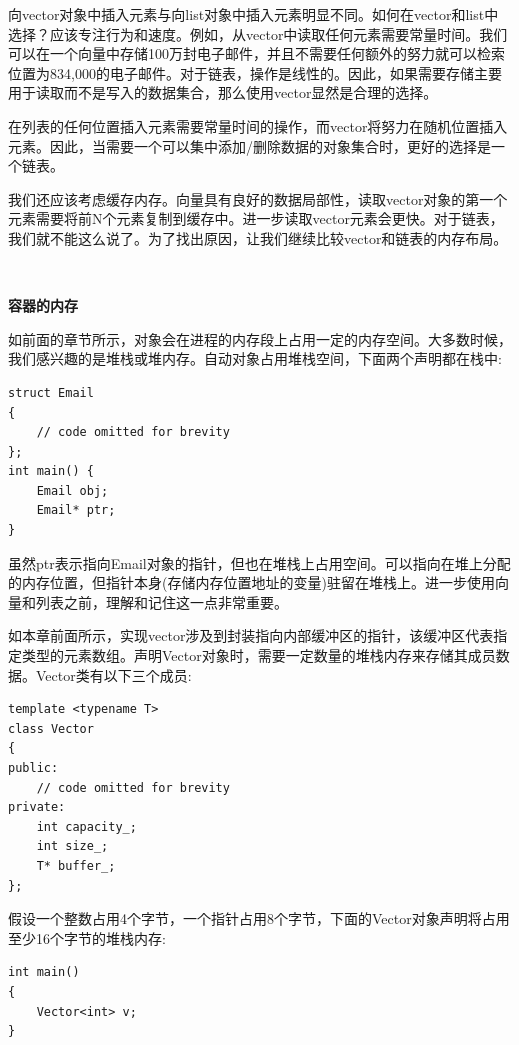 向vector对象中插入元素与向list对象中插入元素明显不同。如何在vector和list中选择？应该专注行为和速度。例如，从vector中读取任何元素需要常量时间。我们可以在一个向量中存储100万封电子邮件，并且不需要任何额外的努力就可以检索位置为834,000的电子邮件。对于链表，操作是线性的。因此，如果需要存储主要用于读取而不是写入的数据集合，那么使用vector显然是合理的选择。 \par
在列表的任何位置插入元素需要常量时间的操作，而vector将努力在随机位置插入元素。因此，当需要一个可以集中添加/删除数据的对象集合时，更好的选择是一个链表。 \par
我们还应该考虑缓存内存。向量具有良好的数据局部性，读取vector对象的第一个元素需要将前N个元素复制到缓存中。进一步读取vector元素会更快。对于链表，我们就不能这么说了。为了找出原因，让我们继续比较vector和链表的内存布局。 \par

\noindent\textbf{}\ \par
\textbf{容器的内存} \ \par
如前面的章节所示，对象会在进程的内存段上占用一定的内存空间。大多数时候，我们感兴趣的是堆栈或堆内存。自动对象占用堆栈空间，下面两个声明都在栈中: \par

\begin{lstlisting}[caption={}]
struct Email
{
	// code omitted for brevity
};
int main() {
	Email obj;
	Email* ptr;
}
\end{lstlisting}

虽然ptr表示指向Email对象的指针，但也在堆栈上占用空间。可以指向在堆上分配的内存位置，但指针本身(存储内存位置地址的变量)驻留在堆栈上。进一步使用向量和列表之前，理解和记住这一点非常重要。 \par
如本章前面所示，实现vector涉及到封装指向内部缓冲区的指针，该缓冲区代表指定类型的元素数组。声明Vector对象时，需要一定数量的堆栈内存来存储其成员数据。Vector类有以下三个成员: \par

\begin{lstlisting}[caption={}]
template <typename T>
class Vector
{
public:
	// code omitted for brevity
private:
	int capacity_;
	int size_;
	T* buffer_;
};
\end{lstlisting}

假设一个整数占用4个字节，一个指针占用8个字节，下面的Vector对象声明将占用至少16个字节的堆栈内存: \par

\begin{lstlisting}[caption={}]
int main()
{
	Vector<int> v;
}
\end{lstlisting}

